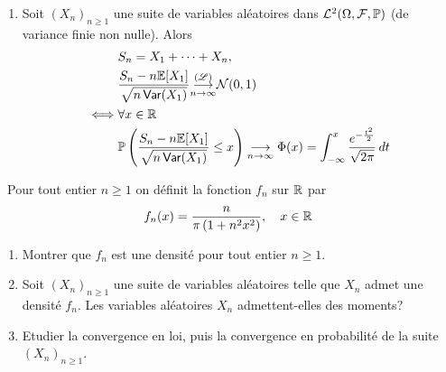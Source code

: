 {\begin{td-sol}
\begin{enumerate}
            

            \item Soit \({(X_n)}_{n\geq 1}\) une suite de variables aléatoires
            \iid{} dans \(\mathcal L^2(\Omega,\mathcal F,\mathbb{P})\) (de variance
            finie non nulle). Alors
            \begin{equation*}
                \begin{aligned}
                    &S_n = X_1 + \cdots + X_n,\\
                    &\frac{S_n-n\mathbb{E}[X_1]}{\sqrt{n\operatorname{\mathsf{Var}}(X_1)}}\underset{n\to\infty}{{\overset{(\mathscr{L})}{\longrightarrow}}} \mathcal N(0,1)\\
                    \iff& \forall x\in \mathbb{R}\\
                    &\mathbb{P}\left(\frac{S_n-n\mathbb{E}[X_1]}{\sqrt{n\operatorname{\mathsf{Var}}(X_1)}}\leq x\right)\underset{n\to\infty}{\longrightarrow} \Phi(x) = \int_{-\infty}^x\frac{e^{-\frac{t^2}{2}}}{\sqrt{2\pi}}\mathop{}\!{d} t
                \end{aligned}
            \end{equation*}
        \end{enumerate}
    \end{td-sol}
}{}

\begin{td-exo}[]\,
    Pour tout entier \(n\geq 1\) on définit la fonction \(f_n\) sur \(\mathbb{R}\)
    par
    \begin{equation*}
        f_n(x) = \frac{n}{\pi\left(1+n^2 x^2\right)},\quad x\in\mathbb{R}
    \end{equation*}
    \begin{enumerate}
        \item Montrer que \(f_n\) est une densité pour tout entier \(n\geq 1\).

        \item Soit \({(X_n)}_{n\geq 1}\) une suite de variables aléatoires telle
        que \(X_n\) admet une densité \(f_n\). Les variables aléatoires \(X_n\)
        admettent-elles des moments?

        \item Etudier la convergence en loi, puis la convergence en probabilité
        de la suite \({(X_n)}_{n\geq 1}\).
    \end{enumerate}
\end{td-exo}

